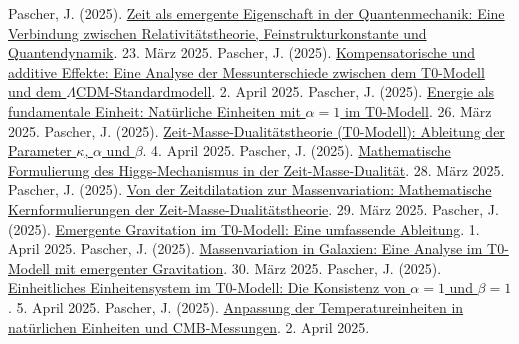 \documentclass[12pt,a4paper]{article}
\begin{document}
	\begin{thebibliography}{99}
		 Pascher, J. (2025). \href{https://github.com/jpascher/T0-Time-Mass-Duality/tree/main/2/pdf/Deutsch/ZeitEmergentQM.pdf}{Zeit als emergente Eigenschaft in der Quantenmechanik: Eine Verbindung zwischen Relativitätstheorie, Feinstrukturkonstante und Quantendynamik}. 23. März 2025.
		 Pascher, J. (2025). \href{https://github.com/jpascher/T0-Time-Mass-Duality/tree/main/2/pdf/Deutsch/MessdifferenzenT0Standard.pdf}{Kompensatorische und additive Effekte: Eine Analyse der Messunterschiede zwischen dem T0-Modell und dem \(\Lambda\)CDM-Standardmodell}. 2. April 2025.
		 Pascher, J. (2025). \href{https://github.com/jpascher/T0-Time-Mass-Duality/tree/main/2/pdf/Deutsch/NatEinheitenAlpha1.pdf}{Energie als fundamentale Einheit: Natürliche Einheiten mit \(\alpha = 1\) im T0-Modell}. 26. März 2025.
		 Pascher, J. (2025). \href{https://github.com/jpascher/T0-Time-Mass-Duality/tree/main/2/pdf/Deutsch/ZeitMasseT0Params.pdf}{Zeit-Masse-Dualitätstheorie (T0-Modell): Ableitung der Parameter \(\kappa\), \(\alpha\) und \(\beta\)}. 4. April 2025.
		 Pascher, J. (2025). \href{https://github.com/jpascher/T0-Time-Mass-Duality/tree/main/2/pdf/Deutsch/MathHiggsZeitMasse.pdf}{Mathematische Formulierung des Higgs-Mechanismus in der Zeit-Masse-Dualität}. 28. März 2025.
		 Pascher, J. (2025). \href{https://github.com/jpascher/T0-Time-Mass-Duality/tree/main/2/pdf/Deutsch/MathZeitMasseLagrange.pdf}{Von der Zeitdilatation zur Massenvariation: Mathematische Kernformulierungen der Zeit-Masse-Dualitätstheorie}. 29. März 2025.
		 Pascher, J. (2025). \href{https://github.com/jpascher/T0-Time-Mass-Duality/tree/main/2/pdf/Deutsch/EmergentGravT0.pdf}{Emergente Gravitation im T0-Modell: Eine umfassende Ableitung}. 1. April 2025.
		 Pascher, J. (2025). \href{https://github.com/jpascher/T0-Time-Mass-Duality/tree/main/2/pdf/Deutsch/MassVarGalaxien.pdf}{Massenvariation in Galaxien: Eine Analyse im T0-Modell mit emergenter Gravitation}. 30. März 2025.
		 Pascher, J. (2025). \href{https://github.com/jpascher/T0-Time-Mass-Duality/tree/main/2/pdf/Deutsch/Alpha1Beta1Konsistenz.pdf}{Einheitliches Einheitensystem im T0-Modell: Die Konsistenz von \(\alpha = 1\) und \(\beta = 1\)}. 5. April 2025.
		 Pascher, J. (2025). \href{https://github.com/jpascher/T0-Time-Mass-Duality/tree/main/2/pdf/Deutsch/TempEinheitenCMB.pdf}{Anpassung der Temperatureinheiten in natürlichen Einheiten und CMB-Messungen}. 2. April 2025.

\end{thebibliography}
\end{document}
